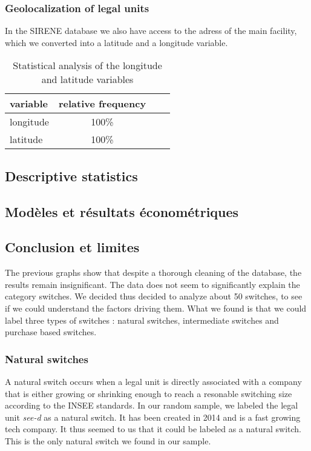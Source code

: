 \documentclass[AEJ]{AEA}
\begin{document}
\subsubsection{Geolocalization of legal units}
In the SIRENE database we also have access to the adress of the main facility,
which we converted into a latitude and a longitude variable.
\begin{table}
    \begin{tabular}{l|c|c|c}
        \hline
        variable & relative frequency \\
        \hline
        longitude & 100\% \\
        \hline
        latitude & 100\% \\
        \hline
    \end{tabular}
    \caption{Statistical analysis of the longitude and latitude variables}
\end{table}
\subsection{Descriptive statistics}
\subsection{Modèles et résultats économétriques}
\subsection{Conclusion et limites}
The previous graphs show that despite a thorough cleaning of the database, the results remain insignificant.
The data does not seem to significantly explain the category switches.
We decided thus decided to analyze about 50 switches, to see if we could understand the factors driving them.
What we found is that we could label three types of switches : natural switches, intermediate switches and purchase based switches.
\subsubsection{Natural switches}
A natural switch occurs when a legal unit is directly associated with a company that is either
growing or shrinking enough to reach a resonable switching size according to the INSEE standards.
In our random sample, we labeled the legal unit \textit{see-d} as a natural switch. It has been created in
2014 and is a fast growing tech company. It thus seemed to us that it could be labeled as a natural switch.
This is the only natural switch we found in our sample. 
\end{document}

